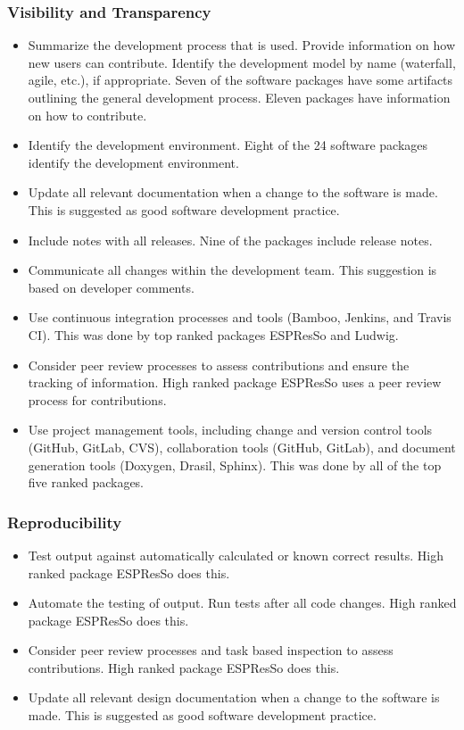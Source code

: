 \documentclass[final, 3p, times, authoryear]{elsarticle}
\begin{document}
\subsubsection{Visibility and Transparency}

\begin{itemize}
	\item Summarize the development process that is used. Provide information on how new users can contribute. Identify the development model by name (waterfall, agile, etc.), if appropriate.  Seven of the software packages have some artifacts outlining the general development process. Eleven packages have information on how to contribute. 
	\item Identify the development environment. Eight of the 24 software packages identify the development environment.
	\item Update all relevant documentation when a change to the software is made. This is suggested as good software development practice.
	\item Include notes with all releases. Nine of the packages include release notes.
	\item Communicate all changes within the development team. This suggestion is based on developer comments.
	\item Use continuous integration processes and tools (Bamboo, Jenkins, and Travis CI). This was done by top ranked packages ESPResSo and Ludwig.
	\item Consider peer review processes to assess contributions and ensure the tracking of information. High ranked package ESPResSo uses a peer review process for contributions. 
	\item Use project management tools, including change and version control tools (GitHub, GitLab, CVS), collaboration tools (GitHub, GitLab), and document generation tools (Doxygen, Drasil, Sphinx). This was done by all of the top five ranked packages. 
\end{itemize}

\subsubsection{Reproducibility}

\begin{itemize}
	\item Test output against automatically calculated or known correct results. High ranked package ESPResSo does this.
	\item Automate the testing of output. Run tests after all code changes. High ranked package ESPResSo does this.
	\item Consider peer review processes and task based inspection to assess contributions. High ranked package ESPResSo does this.
	\item Update all relevant design documentation when a change to the software is made. This is suggested as good software development practice.
\end{itemize}
\end{document}
